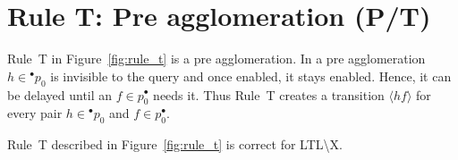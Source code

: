 \section*{Rule T: Pre agglomeration (P/T)}\label{sec:rule_t}

Rule~T in Figure~\ref{fig:rule_t} is a pre agglomeration.
In a pre agglomeration $h\in{}^\bullet p_0$ is invisible to the query and once enabled, it stays enabled.
Hence, it can be delayed until an $f\in p_0^\bullet$ needs it.
Thus Rule~T creates a transition $\langle h f\rangle$ for every pair $h\in{}^\bullet p_0$ and $f\in p_0^\bullet$.

\begin{theorem}
    Rule~T described in Figure~\ref{fig:rule_t} is correct for LTL\textbackslash X.
\end{theorem}

